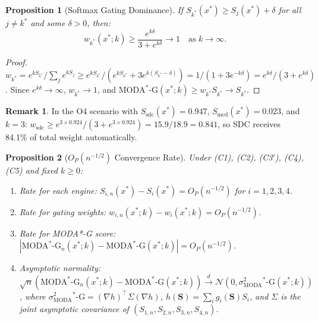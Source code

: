 \documentclass[11pt]{article}
\theoremstyle{plain}
\newtheorem{proposition}{Proposition}
\theoremstyle{definition}
\newtheorem{remark}{Remark}
\newcommand{\indist}{\xrightarrow{d}}
\newcommand{\moda}{\text{MODA}^*\text{-G}}
\begin{document}
\begin{proposition}[Softmax Gating Dominance]
\label{prop:gating}
If $S_{k^*}(x^*) \geq S_j(x^*) + \delta$ for all
$j \neq k^*$ and some $\delta > 0$, then:
\begin{equation}
  w_{k^*}(x^*; k) \geq
  \frac{e^{k\delta}}{3 + e^{k\delta}} \to 1
  \quad \text{as } k \to \infty.
  \label{eq:prop1}
\end{equation}
\end{proposition}

\begin{proof}
$w_{k^*} = e^{kS_{k^*}}/\sum_j e^{kS_j}
\geq e^{kS_{k^*}} / (e^{kS_{k^*}} +
3e^{k(S_{k^*}-\delta)}) =
1/(1 + 3e^{-k\delta}) = e^{k\delta}/(3+e^{k\delta})$.
Since $e^{k\delta} \to \infty$, $w_{k^*} \to 1$,
and $\moda(x^*;k) \geq w_{k^*} S_{k^*} \to S_{k^*}$.
\end{proof}

\begin{remark}
In the O4 scenario with $S_\text{sdc}(x^*)=0.947$,
$S_\text{mcd}(x^*)=0.023$, and $k=3$:
$w_\text{sdc} \geq e^{3 \times 0.924}/
(3 + e^{3 \times 0.924}) = 15.9/18.9 = 0.841$,
so SDC receives 84.1\% of total weight automatically.
\end{remark}

\begin{proposition}[$O_P(n^{-1/2})$ Convergence Rate]
\label{prop:rate}
Under (C1), (C2), (C3$'$), (C4), (C5) and fixed
$k \geq 0$:
\begin{enumerate}[label=(\roman*)]
  \item \emph{Rate for each engine:}
    $S_{i,n}(x^*) - S_i(x^*) = O_P(n^{-1/2})$
    for $i = 1,2,3,4$.
  \item \emph{Rate for gating weights:}
    $w_{i,n}(x^*;k) - w_i(x^*;k) = O_P(n^{-1/2})$.
  \item \emph{Rate for MODA*-G score:}
    $|\moda_n(x^*;k) - \moda(x^*;k)| =
    O_P(n^{-1/2})$.
  \item \emph{Asymptotic normality:}
    $\sqrt{n}(\moda_n(x^*;k) - \moda(x^*;k))
    \indist \mathcal{N}(0, \sigma^2_\moda(x^*;k))$,
    where $\sigma^2_\moda = (\nabla h)^\top \Sigma
    (\nabla h)$, $h(\mathbf{S}) = \sum_i g_i(\mathbf{S})
    S_i$, and $\Sigma$ is the joint asymptotic covariance
    of $(S_{1,n}, S_{2,n}, S_{3,n}, S_{4,n})$.
\end{enumerate}
\end{proposition}
\end{document}
